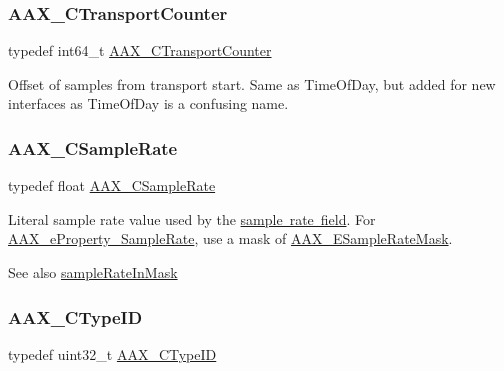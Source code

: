\mbox{\label{a00392_ac09cd6857748cc296ac0f8bcc20dc74b}} 
\subsubsection{\texorpdfstring{AAX\_CTransportCounter}{AAX\_CTransportCounter}}
{\footnotesize\ttfamily typedef int64\+\_\+t \mbox{\hyperlink{a00392_ac09cd6857748cc296ac0f8bcc20dc74b}{A\+A\+X\+\_\+\+C\+Transport\+Counter}}}



Offset of samples from transport start. Same as Time\+Of\+Day, but added for new interfaces as Time\+Of\+Day is a confusing name. 

\mbox{\label{a00392_a3d9eea08f47e0b0a23432e15baa4e885}} 
\subsubsection{\texorpdfstring{AAX\_CSampleRate}{AAX\_CSampleRate}}
{\footnotesize\ttfamily typedef float \mbox{\hyperlink{a00392_a3d9eea08f47e0b0a23432e15baa4e885}{A\+A\+X\+\_\+\+C\+Sample\+Rate}}}



Literal sample rate value used by the \mbox{\hyperlink{a01781_adbd57beaa0a3143d3cf44b93ecdb59ec}{sample rate field}}. For \mbox{\hyperlink{a00662_a13e384f22825afd3db6d68395b79ce0dac5294e2feb18587d57b6ca0216a6bb1e}{A\+A\+X\+\_\+e\+Property\+\_\+\+Sample\+Rate}}, use a mask of \mbox{\hyperlink{a00491_a5bb98259de21d2c4d04a2d6010d757c7}{A\+A\+X\+\_\+\+E\+Sample\+Rate\+Mask}}. 

\begin{DoxySeeAlso}{See also}
\mbox{\hyperlink{a00392_adec37d03995016a9e25490d5785f0d8b}{sample\+Rate\+In\+Mask}} 
\end{DoxySeeAlso}
\mbox{\label{a00392_ac678f9c1fbcc26315d209f71a147a175}} 
\subsubsection{\texorpdfstring{AAX\_CTypeID}{AAX\_CTypeID}}
{\footnotesize\ttfamily typedef uint32\+\_\+t \mbox{\hyperlink{a00392_ac678f9c1fbcc26315d209f71a147a175}{A\+A\+X\+\_\+\+C\+Type\+ID}}}



